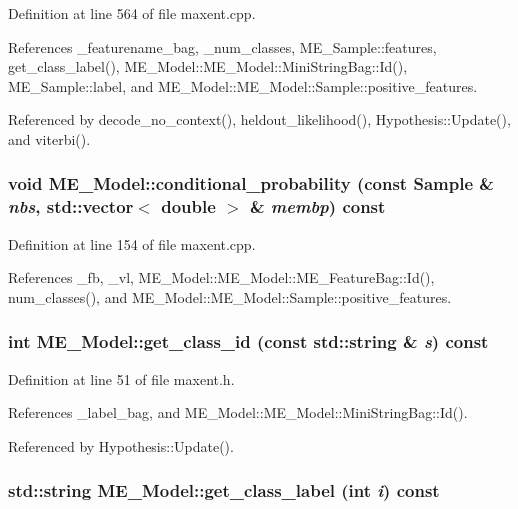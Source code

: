 Definition at line 564 of file maxent.cpp.

References \_\-featurename\_\-bag, \_\-num\_\-classes, ME\_\-Sample::features, get\_\-class\_\-label(), ME\_\-Model::ME\_\-Model::MiniStringBag::Id(), ME\_\-Sample::label, and ME\_\-Model::ME\_\-Model::Sample::positive\_\-features.

Referenced by decode\_\-no\_\-context(), heldout\_\-likelihood(), Hypothesis::Update(), and viterbi().\hypertarget{classME__Model_8210bdb521edd5c9293b3ebba75d7c06}{
\subsubsection[{conditional\_\-probability}]{\setlength{\rightskip}{0pt plus 5cm}void ME\_\-Model::conditional\_\-probability (const {\bf Sample} \& {\em nbs}, \/  std::vector$<$ double $>$ \& {\em membp}) const}}
\label{classME__Model_8210bdb521edd5c9293b3ebba75d7c06}




Definition at line 154 of file maxent.cpp.

References \_\-fb, \_\-vl, ME\_\-Model::ME\_\-Model::ME\_\-FeatureBag::Id(), num\_\-classes(), and ME\_\-Model::ME\_\-Model::Sample::positive\_\-features.\hypertarget{classME__Model_1723d988619ce8b789de6181630f384a}{
\subsubsection[{get\_\-class\_\-id}]{\setlength{\rightskip}{0pt plus 5cm}int ME\_\-Model::get\_\-class\_\-id (const std::string \& {\em s}) const}}
\label{classME__Model_1723d988619ce8b789de6181630f384a}




Definition at line 51 of file maxent.h.

References \_\-label\_\-bag, and ME\_\-Model::ME\_\-Model::MiniStringBag::Id().

Referenced by Hypothesis::Update().\hypertarget{classME__Model_ab8a707a23f53cb60a0bb6eff0a602bd}{
\subsubsection[{get\_\-class\_\-label}]{\setlength{\rightskip}{0pt plus 5cm}std::string ME\_\-Model::get\_\-class\_\-label (int {\em i}) const}}
\label{classME__Model_ab8a707a23f53cb60a0bb6eff0a602bd}





